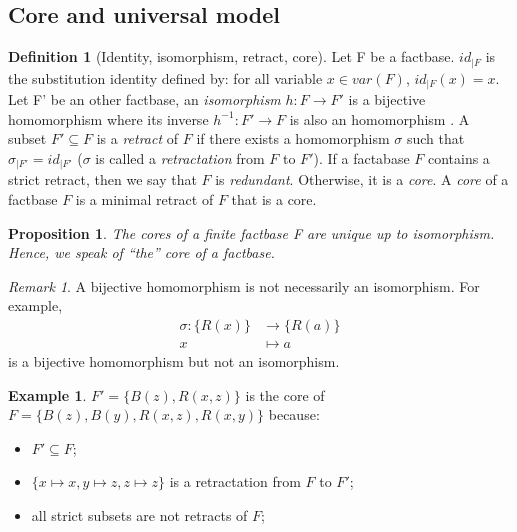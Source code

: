 \documentclass{article}
\newtheorem{proposition}{Proposition}[section]
\theoremstyle{definition}
\newtheorem{definition}{Definition}[section]
\newtheorem{example}{Example}[section]
\theoremstyle{remark}
\newtheorem{remark}{Remark}[section]
\begin{document}
\subsection{Core and universal model}

\begin{definition}[Identity, isomorphism, retract, core]
Let F be a factbase. $id_{|F}$ is the substitution identity defined by: for all variable $x \in var(F)$, $id_{|F}(x) = x$. Let F' be an other factbase, an \emph{isomorphism} $h: F \to F'$ is a bijective homomorphism where its inverse $h^{-1}:F' \to F$ is also an homomorphism . A subset $F' \subseteq F$ is a \emph{retract} of $F$ if there exists a homomorphism $\sigma$ such that $\sigma_{|F'}=id_{|F'}$ %
($\sigma$ is called a \emph{retractation} from $F$ to $F'$). If a factabase $F$ contains a strict retract, then we say that $F$ is \emph{redundant}. Otherwise, it is a \emph{core}. A \emph{core} of a factbase $F$ is a minimal retract of $F$ that is a core.
\end{definition}


\begin{proposition}
The cores of a finite factbase F are unique up to isomorphism. Hence, we speak of ``the'' core of a factbase.
\end{proposition}

\begin{remark}
A bijective homomorphism is not necessarily an isomorphism. For example, 
\begin{align*}
\sigma:\{R(x)\} &\to \{R(a)\}\\
x &\mapsto a
\end{align*}
is a bijective homomorphism but not an isomorphism.
\end{remark}

\begin{example}
$F' = \{B(z),R(x,z)\}$ is the core of $F = \{B(z),B(y),R(x,z),R(x,y)\}$ because:
\begin{itemize}
\item $F' \subseteq F$;
\item $\{x \mapsto x, y \mapsto z, z \mapsto z\}$ is a retractation from $F$ to $F'$;
\item all strict subsets are not retracts of $F$;
\end{itemize}
\end{example}
\end{document}
